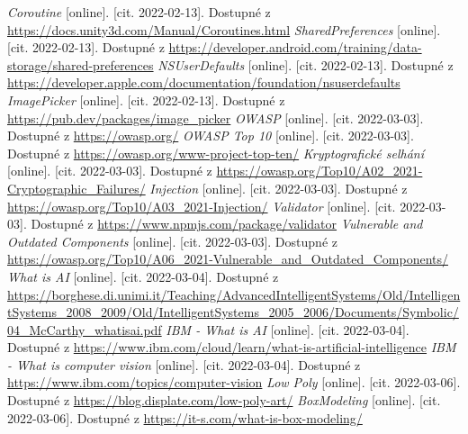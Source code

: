 \begin{thebibliography}{99}
     \textit{Coroutine} [online]. [cit. 2022-02-13]. Dostupné z \url{https://docs.unity3d.com/Manual/Coroutines.html}
     \textit{SharedPreferences} [online]. [cit. 2022-02-13]. Dostupné z \url{https://developer.android.com/training/data-storage/shared-preferences}
     \textit{NSUserDefaults} [online]. [cit. 2022-02-13]. Dostupné z \url{https://developer.apple.com/documentation/foundation/nsuserdefaults}
     \textit{ImagePicker} [online]. [cit. 2022-02-13]. Dostupné z \url{https://pub.dev/packages/image_picker}
     \textit{OWASP} [online]. [cit. 2022-03-03]. Dostupné z \url{https://owasp.org/}
     \textit{OWASP Top 10} [online]. [cit. 2022-03-03]. Dostupné z \url{https://owasp.org/www-project-top-ten/}
     \textit{Kryptografické selhání} [online]. [cit. 2022-03-03]. Dostupné z \url{https://owasp.org/Top10/A02_2021-Cryptographic_Failures/}
     \textit{Injection} [online]. [cit. 2022-03-03]. Dostupné z \url{https://owasp.org/Top10/A03_2021-Injection/}
     \textit{Validator} [online]. [cit. 2022-03-03]. Dostupné z \url{https://www.npmjs.com/package/validator}
     \textit{Vulnerable and Outdated Components} [online]. [cit. 2022-03-03]. Dostupné z \url{https://owasp.org/Top10/A06_2021-Vulnerable_and_Outdated_Components/}
     \textit{What is AI} [online]. [cit. 2022-03-04]. Dostupné z \url{https://borghese.di.unimi.it/Teaching/AdvancedIntelligentSystems/Old/IntelligentSystems_2008_2009/Old/IntelligentSystems_2005_2006/Documents/Symbolic/04_McCarthy_whatisai.pdf}
     \textit{IBM - What is AI} [online]. [cit. 2022-03-04]. Dostupné z \url{https://www.ibm.com/cloud/learn/what-is-artificial-intelligence}
     \textit{IBM - What is computer vision} [online]. [cit. 2022-03-04]. Dostupné z \url{https://www.ibm.com/topics/computer-vision}
     \textit{Low Poly} [online]. [cit. 2022-03-06]. Dostupné z \url{https://blog.displate.com/low-poly-art/}
     \textit{BoxModeling} [online]. [cit. 2022-03-06]. Dostupné z \url{https://it-s.com/what-is-box-modeling/}
\end{thebibliography}